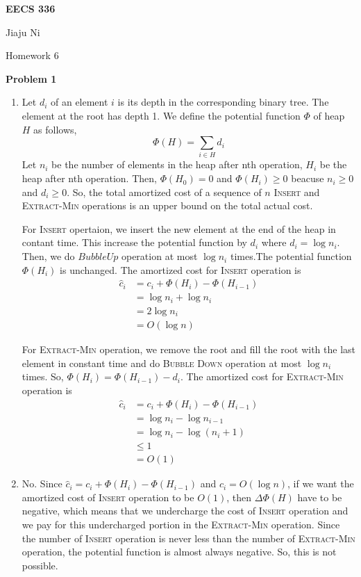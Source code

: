\documentclass[12pt,letterpaper]{article}
\def\pp{\par\noindent}
\newcommand{\problem}[1]{ \bigskip \pp \textbf{Problem #1}\par}
\begin{document}
\centerline{\bf EECS 336}

\medskip
\centerline{Jiaju Ni}
\centerline{Homework 6}
\bigskip


\problem{1}
\begin{enumerate}
	\item
		Let $d_i$ of an element $i$ is its depth in the corresponding binary tree. The element at the root has depth 1. We define the potential function $\Phi$ of heap $H$ as follows,
		\[\Phi(H)=\sum_{i\in H}d_i\]
		Let $n_i$ be the number of elements in the heap after nth operation, $H_i$ be the heap after nth operation. Then, $\Phi(H_0)=0$ and $\Phi(H_i)\geq 0$ beacuse $n_i\geq 0$ and $d_i\geq 0$. So, the total amortized cost of a sequence of $n$ \textsc{Insert} and \textsc{Extract-Min} operations is an upper bound on the total actual cost.\par
		For \textsc{Insert} opertaion, we insert the new element at the end of the heap in contant time. This increase the potential function by $d_i$ where $d_i=\log n_i$. Then, we do $Bubble Up$ operation at most $\log n_i$ times.The potential function $\Phi(H_i)$ is unchanged. The amortized cost for \textsc{Insert} operation is
		\begin{align*}
			\widehat{c}_i&=c_i+\Phi(H_i)-\Phi(H_{i-1})\\
			&=\log n_i +\log n_i\\
			&=2\log n_i\\
			&=O(\log n)
		\end{align*}\par
		For \textsc{Extract-Min} operation, we remove the root and fill the root with the last element in constant time and do \textsc{Bubble Down} operation at most $\log n_i$ times. So, $\Phi(H_i) = \Phi(H_{i-1}) - d_i$. The amortized cost for \textsc{Extract-Min} operation is
		\begin{align*}
			\widehat{c}_i&=c_i+\Phi(H_i)-\Phi(H_{i-1})\\
			&=\log n_i-\log n_{i-1}\\
			&=\log n_i-\log(n_i+1)\\
			&\leq 1\\
			&=O(1)
		\end{align*}
	\item
		No. Since $\widehat{c}_i=c_i+\Phi(H_i)-\Phi(H_{i-1})$ and $c_i=O(\log n)$, if we want the amortized cost of \textsc{Insert} operation to be $O(1)$, then $\Delta\Phi(H)$ have to be negative, which means that we undercharge the cost of \textsc{Insert} operation and we pay for this undercharged portion in the \textsc{Extract-Min} operation. Since the number of \textsc{Insert} operation is never less than the number of \textsc{Extract-Min} operation, the potential function is almost always negative. So, this is not possible.
\end{enumerate}
\end{document}
